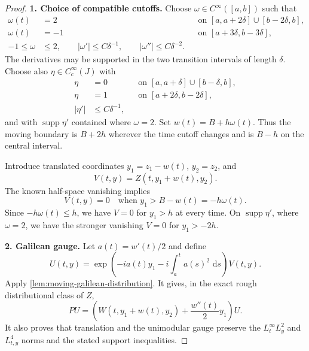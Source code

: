 \documentclass[11pt,oneside]{book}
\theoremstyle{definition}
\theoremstyle{remark}
\newcommand{\supp}{\operatorname{supp}}
\newcommand{\1}{\mathbf 1}
\newcommand{\dd}{\,\mathrm d}
\begin{document}
\begin{proof}
\textbf{1. Choice of compatible cutoffs.}
Choose $\omega\in C^\infty([a,b])$ such that
\begin{align*}
 \omega(t)&=2
 &&\text{on }[a,a+2\delta]\cup[b-2\delta,b],\\
 \omega(t)&=-1
 &&\text{on }[a+3\delta,b-3\delta],\\
 -1\le\omega&\le2,
 \qquad |\omega'|\le C\delta^{-1},
 \qquad |\omega''|\le C\delta^{-2}.
\end{align*}
The derivatives may be supported in the two transition intervals of length
$\delta$.  Choose also $\eta\in C_c^\infty(J)$ with
\begin{align*}
 \eta&=0
 &&\text{on }[a,a+\delta]\cup[b-\delta,b],\\
 \eta&=1
 &&\text{on }[a+2\delta,b-2\delta],\\
 |\eta'|&\le C\delta^{-1},
\end{align*}
and with $\supp\eta'$ contained where $\omega=2$.  Set
$w(t)=B+h\omega(t)$.  Thus the moving boundary is $B+2h$ wherever the time
cutoff changes and is $B-h$ on the central interval.

Introduce translated coordinates $y_1=z_1-w(t)$, $y_2=z_2$, and
\[
 V(t,y)=Z(t,y_1+w(t),y_2).
\]
The known half-space vanishing implies
\begin{equation}
 V(t,y)=0\quad\text{when }y_1>B-w(t)=-h\omega(t).   \label{eq:V-upper-support}
\end{equation}
Since $-h\omega(t)\le h$, we have $V=0$ for $y_1>h$ at every time.  On
$\supp\eta'$, where $\omega=2$, we have the stronger vanishing
$V=0$ for $y_1>-2h$.

\textbf{2. Galilean gauge.}
Let $a(t)=w'(t)/2$ and define
\[
 U(t,y)=\exp\!\left(-ia(t)y_1-i\int_a^t a(s)^2\,\dd s\right)V(t,y).
\]
Apply \cref{lem:moving-galilean-distribution}.  It gives, in the exact
rough distributional class of $Z$,
\begin{equation}
 PU=\left(W(t,y_1+w(t),y_2)+\frac{w''(t)}2y_1\right)U. \label{eq:gauged-moving}
\end{equation}
It also proves that translation and the unimodular gauge preserve the
$L^\infty_tL^2_y$ and $L^4_{t,y}$ norms and the stated support inequalities.


\end{proof}
\end{document}
